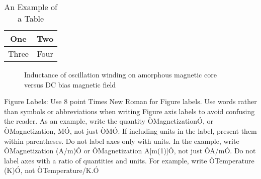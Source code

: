 \begin{table}[h]
\caption{An Example of a Table}
\label{table_example}
\begin{center}
\begin{tabular}{|c||c|}
\hline
One & Two\\
\hline
Three & Four\\
\hline
\end{tabular}
\end{center}
\end{table}


   \begin{figure}[thpb]
      \centering
      \caption{Inductance of oscillation winding on amorphous
       magnetic core versus DC bias magnetic field}
      \label{figurelabel}
   \end{figure}
   

Figure Labels: Use 8 point Times New Roman for Figure labels. Use words rather 
than symbols or abbreviations when writing Figure axis labels to avoid confusing 
the reader. As an example, write the quantity ÒMagnetizationÓ, or 
ÒMagnetization, MÓ, not just ÒMÓ. If including units in the label, present them 
within parentheses. Do not label axes only with units. In the example, write 
ÒMagnetization (A/m)Ó or ÒMagnetization {A[m(1)]}Ó, not just ÒA/mÓ. Do not label 
axes with a ratio of quantities and units. For example, write ÒTemperature (K)Ó, 
not ÒTemperature/K.Ó
